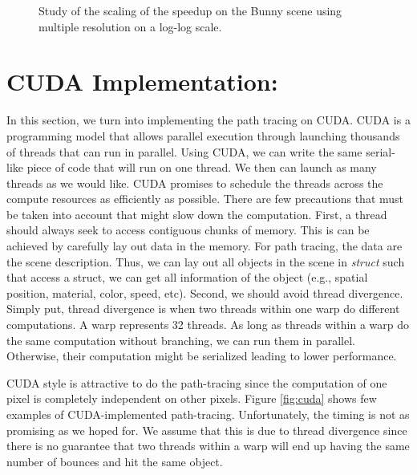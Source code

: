 \documentclass[12pt] {article}
\begin{document}
\begin{figure}[!tbh]
 \centering        
   \caption{Study of the scaling of the speedup on the Bunny scene using multiple resolution on a log-log scale.}
   \label{fig:study}
\end{figure}

\section{CUDA Implementation:}

In this section, we turn into implementing the path tracing on CUDA. CUDA is a programming model that allows parallel execution through launching thousands of threads that can run in parallel. Using CUDA, we can write the same serial-like piece of code that will run on one thread. We then can launch as many threads as we would like. CUDA promises to schedule the threads across the compute resources as efficiently as possible. There are few precautions that must be taken into account that might slow down the computation. First, a thread should always seek to access contiguous chunks of memory. This is can be achieved by carefully lay out data in the memory. For path tracing, the data are the scene description. Thus, we can lay out all objects in the scene in \emph{struct} such that access a struct, we can get all information of the object (e.g., spatial position, material, color, speed, etc). Second, we should avoid thread divergence. Simply put, thread divergence is when two threads within one warp do different computations. A warp represents 32 threads. As long as threads within a warp do the same computation without branching, we can run them in parallel. Otherwise, their computation might be serialized leading to lower performance. 


CUDA style is attractive to do the path-tracing since the computation of one pixel is completely independent on other pixels. Figure \ref{fig:cuda} shows few examples of CUDA-implemented path-tracing. Unfortunately, the timing is not as promising as we hoped for. We assume that this is due to thread divergence since there is no guarantee that two threads within a warp will end up having the same number of bounces and hit the same object. 
\end{document}
